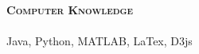 \documentclass[11pt]{article}
\makeatletter
\newcommand{\lineunder}{\vspace*{-8pt} \\ \hspace*{-18pt} \hrulefill \\}
\newcommand{\header}[1]{{\hspace*{-15pt}\vspace*{6pt} \large \textsc{\textbf{#1}}} \vspace*{-6pt} \lineunder}
\newenvironment{achievements}{\begin{list}{$\bullet$}{\topsep 0pt \itemsep -2pt}}{\vspace*{4pt}\end{list}}
\newcommand{\headerrow}[2]
{\begin{tabular*}{\linewidth}{l@{\extracolsep{\fill}}r}
	\hspace*{-15pt}#1 & #2 \\
\end{tabular*}}
\newcommand{\headerrowww}[1]
{\begin{tabular*}{\linewidth}{l@{\extracolsep{\fill}}r}
	#1 &\\
\end{tabular*}}
\newcommand{\CPP}
 {C\nolinebreak[4]\hspace{-.05em}\raisebox{.22ex}{\footnotesize\bf ++}}
\makeatother
\begin{document}
	




  


\vspace*{1.5pt}
\header{Computer Knowledge}
Java, Python, MATLAB, LaTex, D3js
\end{document}
